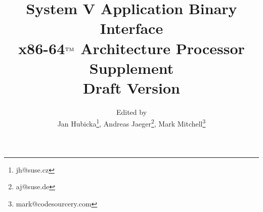 \documentclass[12pt]{report}
\begin{document}
\author{Edited by\\
  Jan Hubicka\thanks{jh@suse.cz}, Andreas Jaeger\thanks{aj@suse.de},
  Mark Mitchell\thanks{mark@codesourcery.com}}

\title{System V Application Binary Interface\\
{\Large x86-64$^{\rm TM}$ Architecture Processor Supplement\\
Draft Version \version}}
\maketitle
\tableofcontents
\listoftables
\listoffigures











\appendix


\end{document}
